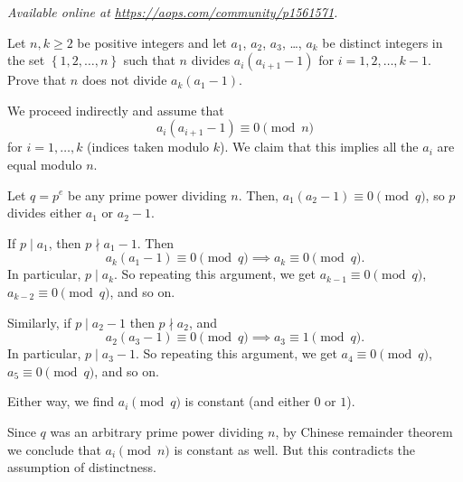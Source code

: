 \textsl{Available online at \url{https://aops.com/community/p1561571}.}
\begin{mdframed}[style=mdpurplebox,frametitle={Problem statement}]
Let $n, k \ge 2$ be positive integers and let $a_1$, $a_2$, $a_3$, \dots, $a_k$
be distinct integers in the set $\left\{ 1,2,\dots,n \right\}$
such that $n$ divides $a_i(a_{i+1} - 1)$ for $i = 1,2,\dots,k-1$.
Prove that $n$ does not divide $a_k(a_1 - 1)$.
\end{mdframed}
We proceed indirectly and assume that
\[ a_i (a_{i+1}-1) \equiv 0 \pmod n \]
for $i = 1, \dots, k$ (indices taken modulo $k$).
We claim that this implies all the $a_i$ are equal modulo $n$.

Let $q = p^e$ be any prime power dividing $n$.
Then, $a_1 (a_2 - 1) \equiv 0 \pmod q$, so $p$ divides either $a_1$ or $a_2-1$.
\begin{itemize}
  \ii If $p \mid a_1$, then $p \nmid a_1 - 1$. Then
  \[ a_k (a_1-1) \equiv 0 \pmod q \implies a_k \equiv 0 \pmod q. \]
  In particular, $p \mid a_k$.
  So repeating this argument,
  we get $a_{k-1} \equiv 0 \pmod q$, $a_{k-2} \equiv 0 \pmod q$, and so on.

  \ii Similarly, if $p \mid a_2 - 1$ then $p \nmid a_2$, and
  \[ a_2 (a_3-1) \equiv 0 \pmod q \implies a_3 \equiv 1 \pmod q.  \]
  In particular, $p \mid a_3 - 1$.
  So repeating this argument,
  we get $a_4 \equiv 0 \pmod q$, $a_5 \equiv 0 \pmod q$, and so on.
\end{itemize}
Either way, we find $a_i \pmod q$ is constant (and either $0$ or $1$).

Since $q$ was an arbitrary prime power dividing $n$,
by Chinese remainder theorem we conclude that $a_i \pmod n$ is constant as well.
But this contradicts the assumption of distinctness.
\pagebreak